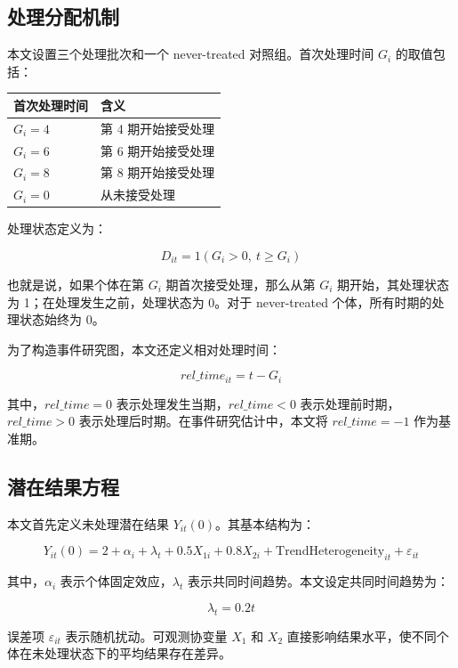 \documentclass[
  fontset=windows]{ctexart}
\newcounter{none} %
\begin{document}
\subsection{处理分配机制}\label{ux5904ux7406ux5206ux914dux673aux5236}

本文设置三个处理批次和一个 never-treated 对照组。首次处理时间 \(G_i\)
的取值包括：

{\def\LTcaptype{none} %
\begin{longtable}[]{@{}ll@{}}
\toprule\noalign{}
首次处理时间 & 含义 \\
\midrule\noalign{}
\endhead
\bottomrule\noalign{}
\endlastfoot
\(G_i=4\) & 第 4 期开始接受处理 \\
\(G_i=6\) & 第 6 期开始接受处理 \\
\(G_i=8\) & 第 8 期开始接受处理 \\
\(G_i=0\) & 从未接受处理 \\
\end{longtable}
}

处理状态定义为：

\[
D_{it}=1(G_i>0,\ t\geq G_i)
\]

也就是说，如果个体在第 \(G_i\) 期首次接受处理，那么从第 \(G_i\)
期开始，其处理状态为 1；在处理发生之前，处理状态为 0。对于 never-treated
个体，所有时期的处理状态始终为 0。

为了构造事件研究图，本文还定义相对处理时间：

\[
rel\_time_{it}=t-G_i
\]

其中，\(rel\_time=0\) 表示处理发生当期，\(rel\_time<0\)
表示处理前时期，\(rel\_time>0\) 表示处理后时期。在事件研究估计中，本文将
\(rel\_time=-1\) 作为基准期。

\subsection{潜在结果方程}\label{ux6f5cux5728ux7ed3ux679cux65b9ux7a0b}

本文首先定义未处理潜在结果 \(Y_{it}(0)\)。其基本结构为：

\[
Y_{it}(0)
=
2+\alpha_i+\lambda_t+0.5X_{1i}+0.8X_{2i}
+\text{TrendHeterogeneity}_{it}
+\varepsilon_{it}
\]

其中，\(\alpha_i\) 表示个体固定效应，\(\lambda_t\)
表示共同时间趋势。本文设定共同时间趋势为：

\[
\lambda_t=0.2t
\]

误差项 \(\varepsilon_{it}\) 表示随机扰动。可观测协变量 \(X_1\) 和
\(X_2\) 直接影响结果水平，使不同个体在未处理状态下的平均结果存在差异。
\end{document}
